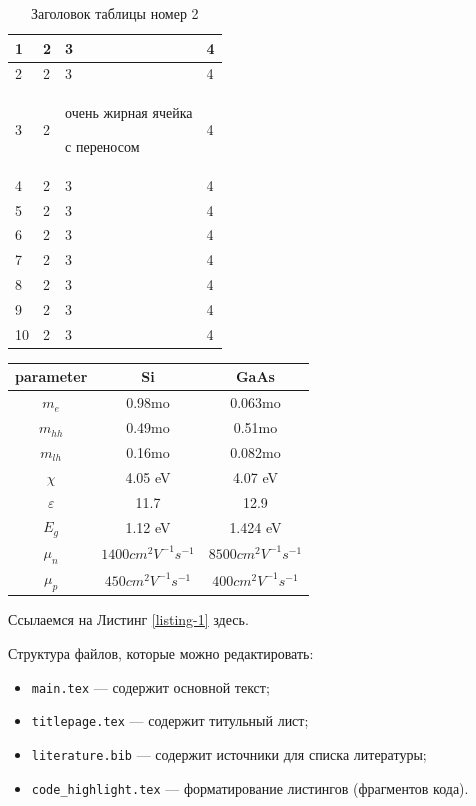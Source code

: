 \documentclass[a4paper,14pt]{extarticle}
\begin{document}
\begin{center}
    \begin{longtable}{|p{2cm}||p{3cm}|p{7cm}|p{3cm}|}
    \caption{Заголовок таблицы номер 2}\\
    \hline
    1 & 2 & 3 & 4\\ 
    \hline
    2 & 2 & 3 & 4\\
    \hline
    3 & 2 & очень жирная ячейка \par с переносом & 4\\
    \hline
    4 & 2 & 3 & 4\\
    \hline
    5 & 2 & 3 & 4\\
    \hline
    6 & 2 & 3 & 4\\
    \hline
    7 & 2 & 3 & 4\\
    \hline
    8 & 2 & 3 & 4\\
    \hline
    9 & 2 & 3 & 4\\
    \hline
    10 & 2 & 3 & 4\\
    \hline
    
    
    \end{longtable}
\end{center}


\begin{tabular}{|c|c|c|}
    \hline 
    parameter & Si & GaAs\tabularnewline
    \hline 
    \hline 
    $m_{e}$ & 0.98mo & 0.063mo\tabularnewline
    \hline 
    $m_{hh}$ & 0.49mo & 0.51mo\tabularnewline
    \hline 
    $m_{lh}$ & 0.16mo & 0.082mo\tabularnewline
    \hline 
    $\chi$ & 4.05 eV & 4.07 eV\tabularnewline
    \hline 
    $\varepsilon$ & 11.7 & 12.9\tabularnewline
    \hline 
    $E_{g}$ & 1.12 eV & 1.424 eV\tabularnewline
    \hline 
    $\mu_{n}$ & $1400cm^{2}V^{-1}s^{-1}$ & $8500cm^{2}V^{-1}s^{-1}$\tabularnewline
    \hline 
    $\mu_{p}$ & $450cm^{2}V^{-1}s^{-1}$ & $400cm^{2}V^{-1}s^{-1}$\tabularnewline
    \hline 
\end{tabular}

\pagebreak
Ссылаемся на Листинг \ref{listing-1} здесь.

\pagebreak
{}
Структура файлов, которые можно редактировать:

\begin{itemize}
    \item \verb|main.tex| --- содержит основной текст;
    \item \verb|titlepage.tex| --- содержит титульный лист;
    \item \verb|literature.bib| --- содержит источники для списка литературы;
    \item \verb|code_highlight.tex| --- форматирование листингов (фрагментов кода).
\end{itemize}
\end{document}
